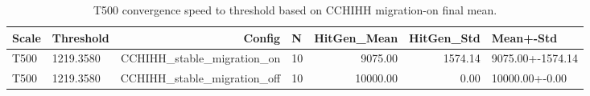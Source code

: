 \begin{table}[htbp]
\centering
\caption{T500 convergence speed to threshold based on CCHIHH migration-on final mean.}
\label{tab:t500_convergence_speed}
\begin{tabular}{llrlrrl}
\toprule
Scale & Threshold & Config & N & HitGen_Mean & HitGen_Std & Mean+-Std \\
\midrule
T500 & 1219.3580 & CCHIHH_stable_migration_on & 10 & 9075.00 & 1574.14 & 9075.00+-1574.14 \\
T500 & 1219.3580 & CCHIHH_stable_migration_off & 10 & 10000.00 & 0.00 & 10000.00+-0.00 \\
\bottomrule
\end{tabular}
\end{table}
